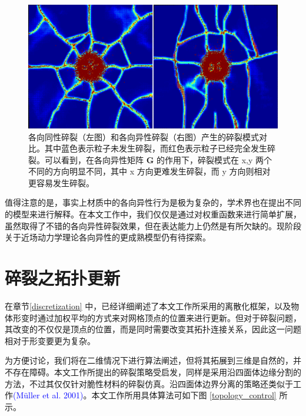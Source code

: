 \begin{figure}[!htb]
  \centering
  \captionsetup{justification=centering}
  \includegraphics[width=0.6\linewidth]{chap/image/demo_impact_color_map}

  \caption{\label{demo_impact_color_map}
           各向同性碎裂（左图）和各向异性碎裂（右图）产生的碎裂模式对比。其中蓝色表示粒子未发生碎裂，而红色表示粒子已经完全发生碎裂。可以看到，在各向异性矩阵 $\mathbf{G}$ 的作用下，碎裂模式在 x,y 两个不同的方向明显不同，其中 x 方向更难发生碎裂，而 y 方向则相对更容易发生碎裂。
          }
\end{figure}

值得注意的是，事实上材质中的各向异性行为是极为复杂的，学术界也在提出不同的模型来进行解释。在本文工作中，我们仅仅是通过对权重函数来进行简单扩展，虽然取得了不错的各向异性碎裂效果，但在表达能力上仍然是有所欠缺的。现阶段关于近场动力学理论各向异性的更成熟模型仍有待探索。

\section{碎裂之拓扑更新}
\label{fracture_discretization}
在章节\ref{discretization} 中，已经详细阐述了本文工作所采用的离散化框架，以及物体形变时通过加权平均的方式来对网格顶点的位置来进行更新。但对于碎裂问题，其改变的不仅仅是顶点的位置，而是同时需要改变其拓扑连接关系，因此这一问题相对于形变要更为复杂。

为方便讨论，我们将在二维情况下进行算法阐述，但将其拓展到三维是自然的，并不存在障碍。本文工作所提出的碎裂策略受启发，同样是采用沿四面体边缘分割的方法，不过其仅仅针对脆性材料的碎裂仿真。沿四面体边界分离的策略还类似于工作\textcolor{blue}{(M\"{u}ller et al. 2001)\supercite{Muller2001}}。本文工作所用具体算法可如下图 \ref{topology_control} 所示。

